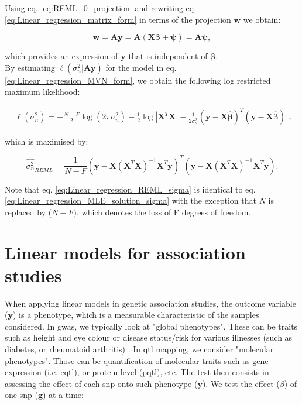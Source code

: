 Using eq. \eqref{eq:REML_0_projection} and rewriting eq. \eqref{eq:Linear_regression_matrix_form} in terms of the projection $\mathbf{w}$ we obtain:

\begin{equation}\label{eq:REML_w_projection}
    \mathbf{w} = \mathbf{A}\mathbf{y} = \mathbf{A}(\mathbf{X}\boldsymbol{\beta} + \boldsymbol{\psi}) = \mathbf{A}\boldsymbol{\psi},
\end{equation}

which provides an expression of $\mathbf{y}$ that is independent of $\boldsymbol{\beta}$.\\

By estimating $\ell(\sigma_n^2 | \mathbf{A}\mathbf{y} )$ for the model in eq. \eqref{eq:Linear_regression_MVN_form}, we obtain the following log restricted maximum likelihood:

\begin{equation} \label{eq:Linear_regression_log_restricted_likelihood}
\begin{split}
\ell(\sigma_n^2) = -\frac{N-F}{2}\log (2\pi\sigma_n^2) - \frac{1}{2}\log |\mathbf{X}^T\mathbf{X}| 
- \frac{1}{2\sigma_n^2}(\mathbf{y}-\mathbf{X}\hat{\boldsymbol{\beta}})^T(\mathbf{y}-\mathbf{X}\hat{\boldsymbol{\beta}})  
\end{split},
\end{equation}

which is maximised by:

\begin{equation}\label{eq:Linear_regression_REML_sigma}
\hat{\sigma_n^2}_{REML} =  \frac{1}{N-F}(\mathbf{y}-\mathbf{X}(\mathbf{X}^T\mathbf{X})^{-1}\mathbf{X}^T\mathbf{y})^T(\mathbf{y}-\mathbf{X}(\mathbf{X}^T\mathbf{X})^{-1}\mathbf{X}^T\mathbf{y}).
\end{equation}

Note that eq. \eqref{eq:Linear_regression_REML_sigma} is identical to eq. \eqref{eq:Linear_regression_MLE_solution_sigma} with the exception that $N$ is replaced by ($N-F$), which denotes the loss of F degrees of freedom.


\section{Linear models for association studies}
\label{sec:linear_models_genetics}

When applying linear models in genetic association studies, the outcome variable ($\mathbf{y}$) is a phenotype, which is a measurable characteristic of the samples considered. 
In \gls{gwas}, we typically look at "global phenotypes".
These can be traits such as height and eye colour or disease status/risk for various illnesses (such as diabetes, or rheumatoid arthritis) \cite{mccarthy2008genome}.
In \gls{qtl} mapping, we consider "molecular phenotypes". 
Those can be quantification of molecular traits such as gene expression (i.e. e\gls{qtl}), or protein level (p\gls{qtl}), etc.
The test then consists in assessing the effect of each \gls{snp} onto such phenotype ($\mathbf{y}$). 
We test the effect ($\beta$) of one \gls{snp} ($\mathbf{g}$) at a time:

